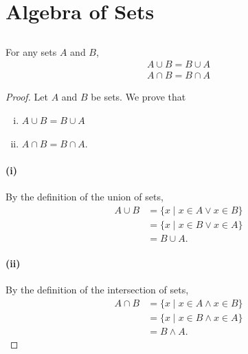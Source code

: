 \documentclass{report}
\begin{document}
\section{Algebra of Sets}%

\subsection{}%

For any sets $A$ and $B$,
  \begin{align*}
    A \cup B = B \cup A \\
    A \cap B = B \cap A
  \end{align*}

\begin{proof}

  \statementpadding



  \noindent Let $A$ and $B$ be sets.
  We prove that
    \begin{enumerate}[(i)]
      \item $A \cup B = B \cup A$
      \item $A \cap B = B \cap A$.
    \end{enumerate}

  \paragraph{(i)}%

    By the definition of the union of sets,
      \begin{align*}
        A \cup B
          & = \{ x \mid x \in A \lor x \in B \} \\
          & = \{ x \mid x \in B \lor x \in A \} \\
          & = B \cup A.
      \end{align*}

  \paragraph{(ii)}%

    By the definition of the intersection of sets,
      \begin{align*}
        A \cap B
          & = \{ x \mid x \in A \land x \in B \} \\
          & = \{ x \mid x \in B \land x \in A \} \\
          & = B \land A.
      \end{align*}

\end{proof}
\end{document}
